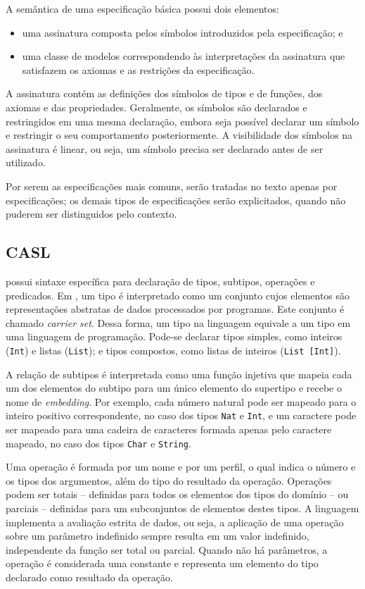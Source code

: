 A semântica de uma especificação básica possui dois elementos:
\begin{itemize}
    \item uma assinatura composta pelos símbolos introduzidos pela especificação; e
    \item uma classe de modelos correspondendo às interpretações da assinatura que satisfazem os axiomas e as restrições da especificação.
\end{itemize}

A assinatura contém as definições dos símbolos de tipos e de funções, dos axiomas e das propriedades.
Geralmente, os símbolos são declarados e restringidos em uma mesma declaração, embora seja possível declarar um símbolo e restringir o seu comportamento posteriormente.
A visibilidade dos símbolos na assinatura é linear, ou seja, um símbolo precisa ser declarado antes de ser utilizado.

Por serem as especificações mais comuns, serão tratadas no texto apenas por especificações; os demais tipos de especificações serão explicitados, quando não puderem ser distinguidos pelo contexto.

\subsection{CASL}
\CASL possui sintaxe específica para declaração de tipos, subtipos, operações e predicados.
Em \CASL, um tipo é interpretado como um conjunto cujos elementos são representações abstratas de dados processados por programas.
Este conjunto é chamado \textit{carrier set}.
Dessa forma, um tipo na linguagem \CASL equivale a um tipo em uma linguagem de programação.
Pode-se declarar tipos simples, como inteiros (\Verb.Int.) e listas (\Verb.List.); e tipos compostos, como listas de inteiros (\Verb.List [Int].).

A relação de subtipos é interpretada como uma função injetiva que mapeia cada um dos elementos do subtipo para um único elemento do supertipo e recebe o nome de \textit{embedding}.
Por exemplo, cada número natural pode ser mapeado para o inteiro positivo correspondente, no caso dos tipos \Verb.Nat. e \Verb.Int., e um caractere pode ser mapeado para uma cadeira de caracteres formada apenas pelo caractere mapeado, no caso dos tipos \Verb.Char. e \Verb.String..

Uma operação é formada por um nome e por um perfil, o qual indica o número e os tipos dos argumentos, além do tipo do resultado da operação.
Operações podem ser totais -- definidas para todos os elementos dos tipos do domínio -- ou parciais -- definidas para um subconjuntos de elementos destes tipos.
A linguagem \CASL implementa a avaliação estrita de dados, ou seja, a aplicação de uma operação sobre um parâmetro indefinido sempre resulta em um valor indefinido, independente da função ser total ou parcial.
Quando não há parâmetros, a operação é considerada uma constante e representa um elemento do tipo declarado como resultado da operação.

